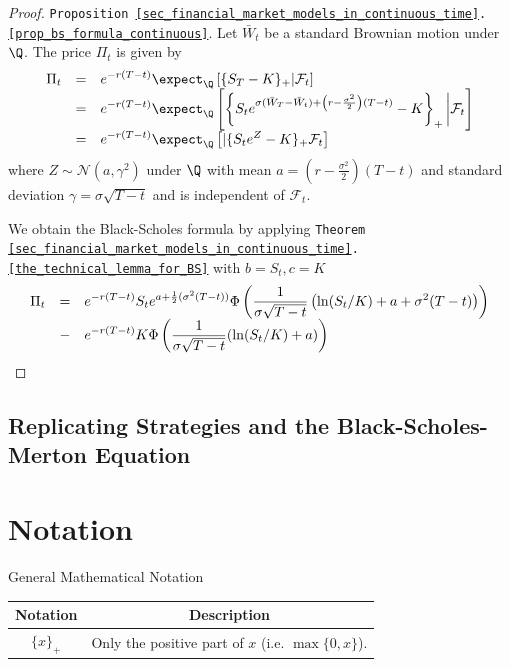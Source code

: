 \documentclass[11pt,a4paper]{article}
\begin{document}
  \begin{proof}{\texttt{Proposition \ref{sec_financial_market_models_in_continuous_time}.\ref{prop_bs_formula_continuous}}.}
    Let $\bar{W}_t$ be a standard Brownian motion under $\Q$. The price $\Pi_t$ is given by
    \[\everymath={\displaystyle}\begin{array}{rcl}
      \Pi_t&=&e^{-r(T-t)}\expect_\Q\left[\{S_T-K\}_+|\mathcal{F}_t\right]\\
      &=&e^{-r(T-t)}\expect_\Q\left[\left\{S_t e^{\sigma(\bar{W}_T-\bar{W}_t)+\left(r-\frac{\sigma^2}2\right)(T-t)}-K\right\}_+\bigg|\mathcal{F}_t\right]\\
      &=&e^{-r(T-t)}\expect_\Q\left[|\{S_te^Z-K\}_+\mathcal{F}_t\right]
    \end{array}\]
    where $Z\sim\mathcal{N}(a,\gamma^2)$ under $\Q$ with mean $a=\left(r-\frac{\sigma^2}2\right)(T-t)$ and standard deviation $\gamma=\sigma\sqrt{T-t}$ and is independent of $\mathcal{F}_t$.
    \par We obtain the Black-Scholes formula by applying \texttt{Theorem \ref{sec_financial_market_models_in_continuous_time}.\ref{the_technical_lemma_for_BS}} with $b=S_t,c=K$
    \[\everymath={\displaystyle}\begin{array}{rcl}
      \Pi_t&=&e^{-r(T-t)}S_te^{a+\frac12(\sigma^2(T-t))}\Phi\left(\frac1{\sigma\sqrt{T-t}}\left(\ln(S_t/K)+a+\sigma^2(T-t)\right)\right)\\
      &-&e^{-r(T-t)}K\Phi\left(\frac1{\sigma\sqrt{T-t}}(\ln(S_t/K)+a)\right)
    \end{array}\]
    \proved
  \end{proof}

\subsection{Replicating Strategies and the Black-Scholes-Merton Equation}

\section{Notation}

  \begin{notation}{General Mathematical Notation}
    \begin{tabular}{c|c}
      Notation&Description\\\hline
      $\{x\}_+$&Only the positive part of $x$ (i.e. $\max\{0,x\}$).
    \end{tabular}
  \end{notation}
\end{document}
